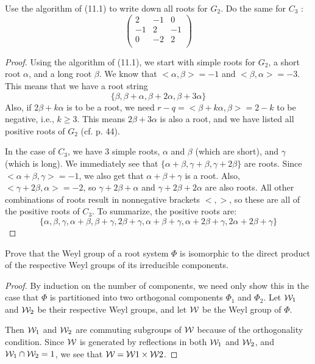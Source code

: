 \begin{ex}\label{11.3}
  Use the algorithm of (11.1) to write down all roots for $G_2$. Do the same for $C_3$ :
  \begin{equation*}
    \begin{pmatrix}
      2 & -1 & 0 \\
      -1 & 2 & -1 \\
      0 & -2 & 2 \\
    \end{pmatrix}
  \end{equation*}
\end{ex}
\begin{proof}
  Using the algorithm of (11.1), we start with simple roots for $G_2$, a short root $\alpha$, and a long root $\beta$. We know that $<\alpha, \beta> = -1$ and $<\beta, \alpha> = -3$.
  This means that we have a root string
  \begin{equation*}
    \{\beta, \beta +\alpha, \beta +2\alpha, \beta +3\alpha\}
  \end{equation*}
  Also, if $2\beta +k\alpha$ is to be a root, we need $r-q = <\beta +k\alpha, \beta> = 2-k$ to be negative, i.e., $k \geqslant 3$. This means $2\beta + 3\alpha$ is also a root, and we have listed all positive roots of $G_2$ (cf. p. 44).

  In the case of $C_3$, we have $3$ simple roots, $\alpha$ and $\beta$ (which are short), and $\gamma$ (which is long). We immediately see that $\{\alpha + \beta, \gamma + \beta, \gamma + 2\beta\}$ are roots. Since $<\alpha + \beta, \gamma> = -1$, we also get that $\alpha + \beta + \gamma$ is a root.
  Also, $< \gamma + 2\beta, \alpha> = -2$, so $\gamma + 2\beta + \alpha$ and $\gamma + 2\beta + 2\alpha$ are also roots. All other combinations of roots result in nonnegative brackets $<,>$, so these are all of the positive roots of $C_3$. To summarize, the positive roots are:
  \begin{equation*}
    \{\alpha, \beta, \gamma, \alpha + \beta, \beta + \gamma, 2\beta + \gamma, \alpha + \beta + \gamma, \alpha + 2\beta + \gamma, 2\alpha + 2\beta + \gamma\}
  \end{equation*}
\end{proof}

\begin{ex}
  Prove that the Weyl group of a root system $\Phi$ is isomorphic to the direct product of the respective Weyl groups of its irreducible components.
\end{ex}
\begin{proof}
  By induction on the number of components, we need only show this in the case that $\Phi$ is partitioned into two orthogonal components $\Phi_1$ and $\Phi_2$.
  Let ${\cal W}_1$ and ${\cal W}_2$ be their respective Weyl groups, and let ${\cal W}$ be the Weyl group of $\Phi$.

  Then ${\cal W}_1$ and ${\cal W}_2$ are commuting subgroups of ${\cal W}$ because of the orthogonality condition. Since ${\cal W}$ is generated by reflections in both ${\cal W}_1$ and ${\cal W}_2$, and ${\cal W}_1 \cap {\cal W}_2 = 1$, we see that ${\cal W} = {\cal W}1 \times {\cal W}2$.
\end{proof}

